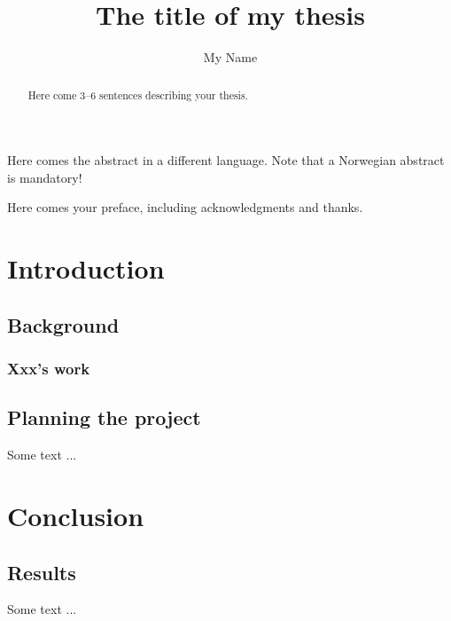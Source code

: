 \documentclass[UKenglish]{uiophdthesis}   %
\title{The title of my thesis}        %
\author{My Name}                      %
\begin{document}
\frontmatter{}
\maketitle{}

\begin{abstract}
  Here come 3--6 sentences describing your thesis.
\end{abstract}

\begin{xabstract}[Sammendrag]               %
  Here comes the abstract in a different language.
  Note that a Norwegian abstract is mandatory!
\end{xabstract}

\tableofcontents{}                          %
\listoffigures{}                            %
\listoftables{}                             %

\begin{preface}
  Here comes your preface, including acknowledgments and thanks.
\end{preface}

\mainmatter{}
\part*{Introduction}                  %
\chapter{Background}                  %
\section{Xxx's work}                  %

\chapter{Planning the project}        %
Some text ...


\part{Conclusion}                     %
\chapter{Results}                     %
Some text ...

\backmatter{}
\printbibliography{}
\end{document}

